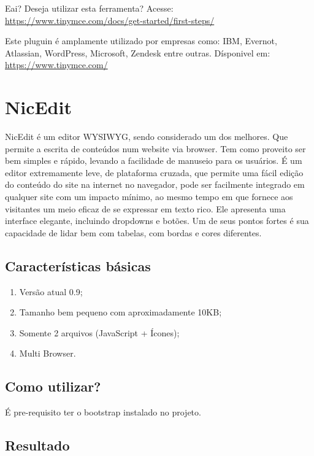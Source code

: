 \documentclass[12pt,a4paper]{article}
\begin{document}
Eai? Deseja utilizar esta ferramenta?
Acesse: \url{ https://www.tinymce.com/docs/get-started/first-steps/}

Este pluguin é amplamente utilizado  por empresas como: IBM, Evernot, Atlassian, WordPress, Microsoft, Zendesk entre outras. Dísponivel em: \url{https://www.tinymce.com/}


\section{NicEdit}
NicEdit é um editor WYSIWYG, sendo considerado um dos melhores. Que permite a escrita de conteúdos num website via browser. Tem como proveito ser bem simples e rápido, levando a facilidade de manuseio para os usuários. 
É um editor extremamente leve, de plataforma cruzada, que permite uma fácil edição do conteúdo do site na internet no navegador, pode ser facilmente integrado em qualquer site com um impacto mínimo, ao mesmo tempo em que fornece aos visitantes um meio eficaz de se expressar em texto rico.
Ele apresenta uma interface elegante, incluindo dropdowns e botões. Um de seus pontos fortes é sua capacidade de lidar bem com tabelas, com bordas e cores diferentes.

\subsection{Características básicas}
\begin{enumerate}
\item Versão atual 0.9;
\item Tamanho bem pequeno com aproximadamente 10KB;
\item Somente 2 arquivos (JavaScript + Ícones);
\item Multi Browser.
\end{enumerate}

\subsection{Como utilizar?}
É pre-requisito ter o bootstrap instalado no projeto.


\subsection{Resultado}
\end{document}

